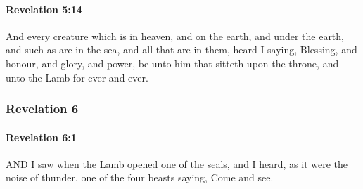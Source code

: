 		\paragraph{Revelation 5:14} %
			\label{REVELATIONNT-5-14}

			And every creature which is in heaven, and on the earth, and under the earth, and such as are in the sea, and all that are in them, heard I saying, Blessing, and honour, and glory, and power, be unto him that sitteth upon the throne, and unto the Lamb for ever and ever.

			\begin{framed}
			\scriptsize
				\begin{compactdesc}
					\item[SBLG] 
				\end{compactdesc}
			\end{framed}

	\subsubsection{Revelation 6} %
		\label{REVELATIONNT-6}
		
		\paragraph{Revelation 6:1} %
			\label{REVELATIONNT-6-1}

			AND I saw when the Lamb opened one of the seals, and I heard, as it were the noise of thunder, one of the four beasts saying, Come and see.

